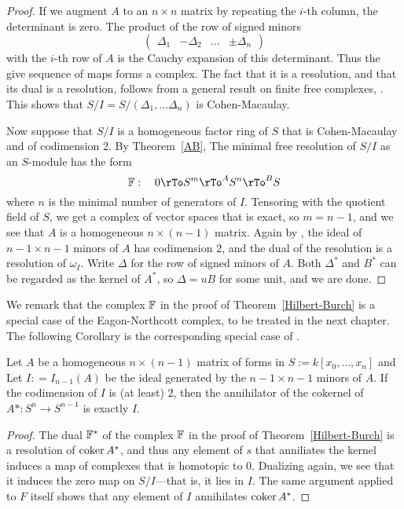 \begin{proof}
If we augment $A$ to an $n\times n$ matrix by repeating the $i$-th column, the determinant is zero.
The product of the row of signed minors 
$$\begin{pmatrix}
 \Delta_{1}& -\Delta_{2}&\dots&\pm \Delta_{n}
\end{pmatrix}
$$ 
with the $i$-th row of $A$ is the Cauchy expansion of this determinant. Thus the give sequence of maps
forms a complex. The fact that it is a resolution, and that its dual is a resolution, follows from a general result on finite free complexes,
\cite[Theorem *****]{E}. This shows that $S/I = S/(\Delta_{1}, \dots \Delta_{n})$ is Cohen-Macaulay.

Now suppose that $S/I$ is a homogeneous factor ring of $S$ that is Cohen-Macaulay and of codimension 2.
By Theorem~\ref{AB}, The minimal free resolution of $S/I$ as an $S$-module has the form 
$$
\FF: \quad 0\rTo S^{m} \rTo^{A} S^{n} \rTo^{B} S
$$
where $n$ is the minimal number of generators of $I$. Tensoring with the quotient field of $S$, we
get a complex of vector spaces that is exact, so $m = n-1$, and we see that $A$ is a homogeneous
$n\times (n-1)$ matrix. Again by \cite[Theorem *****]{E}, the ideal of $n-1\times n-1$ minors of $A$ has
codimension 2, and the dual of the resolution is a resolution of $\omega_{I}$. Write $\Delta$ for the
row of signed minors of $A$. Both $\Delta^*$ and $B^*$ can be regarded as the kernel of $A^*$,
so $\Delta = uB$ for some unit, and we are done.
\end{proof}
We remark that the complex ${\mathbb F}$ in the proof of Theorem~\ref{Hilbert-Burch} is a special case of the Eagon-Northcott complex,
to be treated in the next chapter. The following Corollary is the corresponding special case of \cite[Theorem ***]{BE-annihilator}.

\begin{corollary}\label{annihilator codim 2}
Let $A$ be a homogeneous $n\times (n-1)$ matrix of forms in $S := k[x_{0},\dots, x_{n}]$ and
Let  $I: = I_{n-1}(A)$ be the ideal generated by the $n-1\times n-1$ minors of $A$.
If the codimension of $I$ is (at least) 2, then the annihilator of the cokernel of $A*: S^{n}\to S^{n-1}$ is exactly $I$.
\end{corollary}

\begin{proof}
The dual ${\mathbb F}^*$ of the complex ${\mathbb F}$ in the proof of Theorem~\ref{Hilbert-Burch} is a resolution of ${\rm{coker}\,} A^*$, and thus any
element of $s$ that anniliates the kernel induces a map of complexes that is homotopic to 0. Dualizing again, we see
that it induces the zero map on $S/I$---that is, it lies in $I$. The same argument applied to $F$ itself shows that any element of
$I$ annihilates ${\rm{coker}\,} A^*$.
\end{proof}

